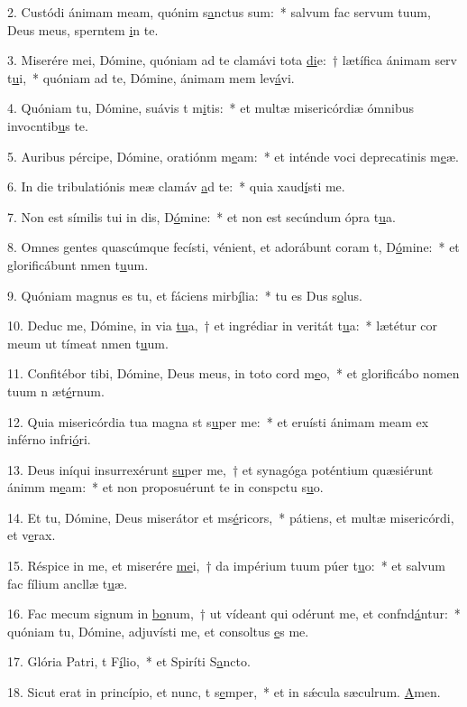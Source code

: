 2. Custódi ánimam meam, quónim s\uline{a}nctus sum:~* salvum fac servum tuum, Deus meus, sperntem \uline{i}n te.\par 
3. Miserére mei, Dómine, quóniam ad te clamávi tota \uline{di}e:~† lætífica ánimam serv t\uline{u}i,~* quóniam ad te, Dómine, ánimam mem lev\uline{á}vi.\par 
4. Quóniam tu, Dómine, suávis t m\uline{i}tis:~* et multæ misericórdiæ ómnibus invocntib\uline{u}s te.\par 
5. Auribus pércipe, Dómine, oratiónm m\uline{e}am:~* et inténde voci deprecatinis m\uline{e}æ.\par 
6. In die tribulatiónis meæ clamáv \uline{a}d te:~* quia xaud\uline{í}sti me.\par 
7. Non est símilis tui in dis, D\uline{ó}mine:~* et non est secúndum ópra t\uline{u}a.\par 
8. Omnes gentes quascúmque fecísti, vénient, et adorábunt coram t, D\uline{ó}mine:~* et glorificábunt nmen t\uline{u}um.\par 
9. Quóniam magnus es tu, et fáciens mirb\uline{í}lia:~* tu es Dus s\uline{o}lus.\par 
10. Deduc me, Dómine, in via \uline{tu}a,~† et ingrédiar in veritát t\uline{u}a:~* lætétur cor meum ut tímeat nmen t\uline{u}um.\par 
11. Confitébor tibi, Dómine, Deus meus, in toto cord m\uline{e}o,~* et glorificábo nomen tuum n æt\uline{é}rnum.\par 
12. Quia misericórdia tua magna st s\uline{u}per me:~* et eruísti ánimam meam ex inférno infri\uline{ó}ri.\par 
13. Deus iníqui insurrexérunt \uline{su}per me,~† et synagóga poténtium quæsiérunt ánimm m\uline{e}am:~* et non proposuérunt te in conspctu s\uline{u}o.\par 
14. Et tu, Dómine, Deus miserátor et ms\uline{é}ricors,~* pátiens, et multæ misericórdi, et v\uline{e}rax.\par 
15. Réspice in me, et miserére \uline{me}i,~† da impérium tuum púer t\uline{u}o:~* et salvum fac fílium ancllæ t\uline{u}æ.\par 
16. Fac mecum signum in \uline{bo}num,~† ut vídeant qui odérunt me, et confnd\uline{á}ntur:~* quóniam tu, Dómine, adjuvísti me, et consoltus \uline{e}s me.\par 
17. Glória Patri, t F\uline{í}lio,~* et Spiríti S\uline{a}ncto.\par 
18. Sicut erat in princípio, et nunc, t s\uline{e}mper,~* et in sǽcula sæculrum. \uline{A}men.\par 
